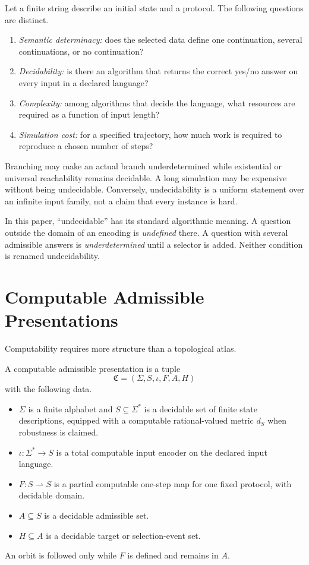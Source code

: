 \documentclass[11pt]{article}
\begin{document}
Let a finite string describe an initial state and a protocol.  The following
questions are distinct.
\begin{enumerate}[label=(\roman*)]
\item \emph{Semantic determinacy:} does the selected data define one
continuation, several continuations, or no continuation?
\item \emph{Decidability:} is there an algorithm that returns the correct
yes/no answer on every input in a declared language?
\item \emph{Complexity:} among algorithms that decide the language, what
resources are required as a function of input length?
\item \emph{Simulation cost:} for a specified trajectory, how much work is
required to reproduce a chosen number of steps?
\end{enumerate}
Branching may make an actual branch underdetermined while existential or
universal reachability remains decidable.  A long simulation may be expensive
without being undecidable.  Conversely, undecidability is a uniform statement
over an infinite input family, not a claim that every instance is hard.

\begin{remark}[Terminology]
In this paper, ``undecidable'' has its standard algorithmic meaning.  A question
outside the domain of an encoding is \emph{undefined} there.  A question with
several admissible answers is \emph{underdetermined} until a selector is added.
Neither condition is renamed undecidability.
\end{remark}

\section{Computable Admissible Presentations}

Computability requires more structure than a topological atlas.

\begin{definition}\label{def:presentation}
A computable admissible presentation is a tuple
\[
 \mathfrak C=(\Sigma,S,\iota,F,A,H)
\]
with the following data.
\begin{itemize}
\item $\Sigma$ is a finite alphabet and $S\subseteq\Sigma^\ast$ is a decidable
set of finite state descriptions, equipped with a computable
rational-valued metric $d_S$ when robustness is claimed.
\item $\iota:\Sigma^\ast\to S$ is a total computable input encoder on the
declared input language.
\item $F:S\rightharpoonup S$ is a partial computable one-step map for one fixed
protocol, with decidable domain.
\item $A\subseteq S$ is a decidable admissible set.
\item $H\subseteq A$ is a decidable target or selection-event set.
\end{itemize}
An orbit is followed only while $F$ is defined and remains in $A$.
\end{definition}
\end{document}
